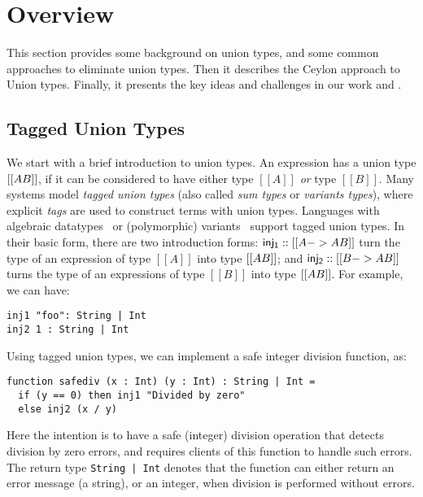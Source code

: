 \section{Overview}
\label{sec:overview}

This section provides some background on union types, and some common approaches
to eliminate union types. Then it describes the Ceylon approach to Union types.
Finally, it presents the key ideas and challenges in our work and \name.

\subsection{Tagged Union Types}


We start with a brief introduction to union types. An expression has a union
type $[[A\/B]]$, if it can be considered to have either type $[[A]]$ \textit{or}
type $[[B]]$. Many systems model \textit{tagged union types} (also called
\textit{sum types} or \textit{variants types}), where explicit \textit{tags}
are used to construct terms with union types. Languages with algebraic datatypes~\cite{hope}
or (polymorphic) variants~\cite{garrigue98} support tagged union types.
In their basic form, there are two introduction forms:
$\mathsf{inj_1} :: [[A -> A \/ B]]$ turn the type of an expression of type
$[[A]]$ into type $[[A \/ B]]$; and $\mathsf{inj_2} :: [[B -> A \/ B]]$
turns the type of an expressions of type $[[B]]$ into type $[[A \/ B]]$.
For example, we can have:

\begin{lstlisting}
inj1 "foo": String | Int
inj2 1 : String | Int
\end{lstlisting}

\noindent Using tagged union types, we can implement a safe integer
division function, as:

\begin{lstlisting}
function safediv (x : Int) (y : Int) : String | Int =
  if (y == 0) then inj1 "Divided by zero"
  else inj2 (x / y)
\end{lstlisting}

\noindent Here the intention is to have a safe (integer) division operation that detects
division by zero errors, and requires clients of this function to handle
such errors. The return type \lstinline{String | Int} denotes that the function
can either return an error message (a string), or an integer, when division
is performed without errors.

